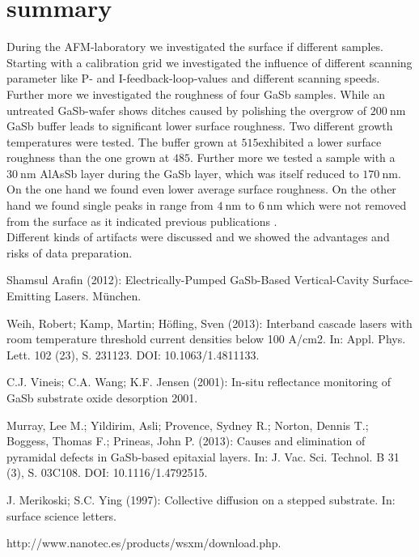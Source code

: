 \documentclass[paper=a4,fontsize=10pt,DIV=18,twocolumn,parskip=half]{scrartcl}
\numberwithin{equation}{section}    %
\begin{document}
\section{summary}
During the AFM-laboratory we investigated the surface if different samples. Starting with a calibration
grid we investigated the influence of different scanning parameter like P- and I-feedback-loop-values 
and different scanning speeds. Further more we investigated the roughness of four GaSb samples. While an untreated GaSb-wafer shows ditches caused by polishing the overgrow of $\SI{200}{\nano\meter}$ GaSb
buffer leads to significant lower surface roughness. Two different growth temperatures were tested.
The buffer grown at $515$\textdegree exhibited a lower surface roughness than the one grown at $485$\textdegree. Further more we tested a sample with a $\SI{30}{\nano\meter}$ AlAsSb layer during the GaSb layer, which was itself reduced to $\SI{170}{\nano\meter}$. On the one hand we found even lower average surface roughness. On the other hand we found single peaks in range from $\SI{4}{\nano\meter}$ to $\SI{6}{\nano\meter}$ which were not removed from the surface as it indicated previous publications \cite{murray}.\\
Different kinds of artifacts were discussed and we showed the advantages and risks of data preparation.

\begin{thebibliography}{}   

 Shamsul Arafin (2012): Electrically-Pumped GaSb-Based 
Vertical-Cavity Surface-Emitting Lasers. München.

 Weih, Robert; Kamp, Martin; Höfling, Sven (2013): Interband 
cascade lasers with room temperature threshold current densities below 100 
A/cm2. In: Appl. Phys. Lett. 102 (23), S. 231123. DOI: 10.1063/1.4811133.

 C.J. Vineis; C.A. Wang; K.F. Jensen (2001): In-situ reflectance 
monitoring of GaSb substrate oxide desorption 2001.

 Murray, Lee M.; Yildirim, Asli; Provence, Sydney R.; Norton, 
Dennis T.; Boggess, Thomas F.; Prineas, John P. (2013): Causes and elimination 
of pyramidal defects in GaSb-based epitaxial layers. In: J. Vac. Sci. Technol. B 
31 (3), S. 03C108. DOI: 10.1116/1.4792515.
  
 J. Merikoski; S.C. Ying (1997): Collective diffusion on a stepped substrate. In: surface science letters.

 http://www.nanotec.es/products/wsxm/download.php. 
\end{thebibliography}
%
%
\onecolumn
\pagestyle{empty}
\appendix

\end{document}
